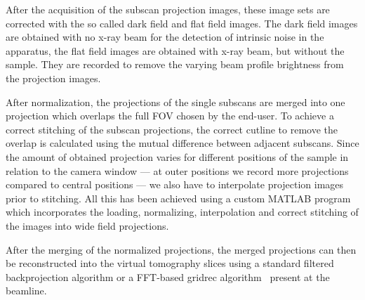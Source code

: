 After the acquisition of the subscan projection images, these image sets are corrected with the so called dark field and flat field images. The dark field images are obtained with no x-ray beam for the detection of intrinsic noise in the apparatus, the flat field images are obtained with x-ray beam, but without the sample. They are recorded to remove the varying beam profile brightness from the projection images.

After normalization, the projections of the single subscans are merged into one projection which overlaps the full FOV chosen by the end-user. To achieve a correct stitching of the subscan projections, the correct cutline to remove the overlap is calculated using the mutual difference between adjacent subscans. Since the amount of obtained projection varies for different positions of the sample in relation to the camera window --- at outer positions we record more projections compared to central positions --- we also have to interpolate projection images prior to stitching. All this has been achieved using a custom MATLAB\textsuperscript{\textregistered} program which incorporates the loading, normalizing, interpolation and correct stitching of the images into wide field projections.

After the merging of the normalized projections, the merged projections can then be reconstructed into the virtual tomography slices using a standard filtered backprojection algorithm or a FFT-based gridrec algorithm~\cite{Dowd2003} present at the beamline.